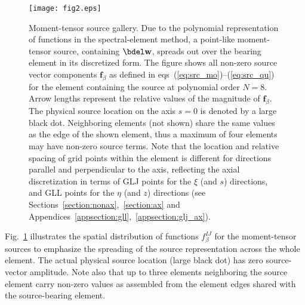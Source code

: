 \begin{figure}[htb!]
\begin{center}
\texttt{[image: fig2.eps]}
\caption{Moment-tensor source gallery. Due to the polynomial representation of 
functions in the spectral-element method, a point-like moment-tensor source,
containing $\bdel\mathbf{w}$, spreads out over the bearing 
element in its discretized form. The figure shows all non-zero source vector 
components $\mathbf{f}_\beta$ as defined in 
eqs~(\ref{eq:src_mo})--(\ref{eq:src_qu}) for 
the element containing the source at polynomial order $N=8$. 
Arrow lengths represent the relative values of the magnitude of 
$\mathbf{f}_\beta$. The physical source location on the axis $s=0$ is denoted 
by a large black dot. Neighboring elements (not shown) share 
the same values as the edge of the shown element, thus a maximum of four 
elements may have non-zero source terms. Note that the location and relative 
spacing of grid points within the element is different for directions 
parallel and perpendicular to the axis, reflecting the axial discretization in
terms of GLJ points for the $\xi$ (and $s$) directions, and GLL points for the 
$\eta$ (and $z$) directions
(see Sections~\ref{section:nonax},~\ref{section:ax} and 
Appendices~\ref{appsection:gll},~\ref{appsection:glj_ax}).}
\label{fig2}
\end{center}
\end{figure}
%
Fig.~\ref{fig2} illustrates the spatial distribution of functions 
$f^{IJ}_\beta$ for the moment-tensor sources to emphasize the spreading of 
the source representation across the whole element. 
The actual physical source location (large black dot) has zero
source-vector amplitude. Note also that up to three elements neighboring the 
source element carry non-zero values as assembled from the element edges 
shared with the source-bearing element. 
%
